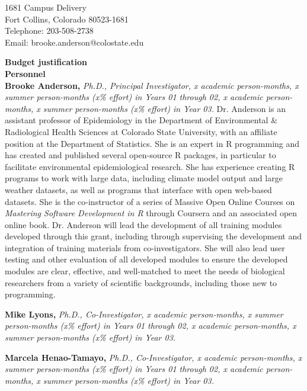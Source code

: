 \documentclass[pdftex,english,12pt,parskip=half]{scrartcl}
\begin{document}
1681 Campus Delivery \\
Fort Collins, Colorado 80523-1681 \\
Telephone: 203-508-2738 \\
Email: brooke.anderson@colostate.edu \\

\clearpage


\textbf{Budget justification} \ \\

{\large \textbf{Personnel}} \\

\noindent \textbf{Brooke Anderson,} \textit{Ph.D., Principal Investigator, x academic person-months, x summer person-months (x\% effort) in Years 01 through 02, x academic person-months, x summer person-months (x\% effort) in Year 03.} Dr. Anderson is an assistant professor of Epidemiology in the Department of Environmental \& Radiological Health Sciences at Colorado State University, with an affiliate position at the Department of Statistics. She is an expert in R programming and has created and published several open-source R packages, in particular to facilitate environmental epidemiological research. She has experience creating R programs to work with large data, including climate model output and large weather datasets, as well as programs that interface with open web-based datasets. She is the co-instructor of a series of Massive Open Online Courses on \textit{Mastering Software Development in R} through Coursera and an associated open online book. Dr. Anderson will lead the development of all training modules developed through this grant, including through supervising the development and integration of training materials from co-investigators. She will also lead user testing and other evaluation of all developed modules to ensure the developed modules are clear, effective, and well-matched to meet the needs of biological researchers from a variety of scientific backgrounds, including those new to programming. 

\noindent \textbf{Mike Lyons,} \textit{Ph.D., Co-Investigator, x academic person-months, x summer person-months (x\% effort) in Years 01 through 02, x academic person-months, x summer person-months (x\% effort) in Year 03.}

\noindent \textbf{Marcela Henao-Tamayo,} \textit{Ph.D., Co-Investigator, x academic person-months, x summer person-months (x\% effort) in Years 01 through 02, x academic person-months, x summer person-months (x\% effort) in Year 03.}
\end{document}
